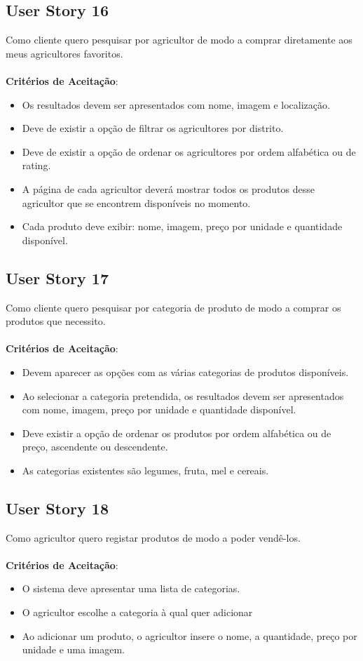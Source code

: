 \documentclass[a4paper,11pt]{article}
\begin{document}
\subsection{User Story 16}
Como cliente quero pesquisar por agricultor de modo a comprar diretamente aos meus agricultores favoritos.\\\\
\textbf{Critérios de Aceitação}:
\begin{itemize}
  \item Os resultados devem ser apresentados com nome, imagem e localização.
  \item Deve de existir a opção de filtrar os agricultores por distrito.
  \item Deve de existir a opção de ordenar os agricultores por ordem alfabética ou de rating.
  \item A página de cada agricultor deverá mostrar todos os produtos desse agricultor que se encontrem disponíveis no momento.
  \item Cada produto deve exibir: nome, imagem, preço por unidade e quantidade disponível.
\end{itemize}
\subsection{User Story 17}
Como cliente quero pesquisar por categoria de produto de modo a comprar os produtos que necessito.\\\\
\textbf{Critérios de Aceitação}:
\begin{itemize}
  \item Devem aparecer as opções com as várias categorias de produtos disponíveis.
  \item Ao selecionar a categoria pretendida, os resultados devem ser apresentados com nome, imagem, preço por unidade e quantidade disponível.
  \item Deve existir a opção de ordenar os produtos por ordem alfabética ou de preço, ascendente ou descendente.
  \item As categorias existentes são legumes, fruta, mel e cereais.
\end{itemize}
\subsection{User Story 18}
Como agricultor quero registar produtos de modo a poder vendê-los.\\\\
\textbf{Critérios de Aceitação}:
\begin{itemize}
  \item O sistema deve apresentar uma lista de categorias.
  \item O agricultor escolhe a categoria à qual quer adicionar 
  \item Ao adicionar um produto, o agricultor insere o nome, a quantidade, preço por unidade e uma imagem.
\end{itemize}
\end{document}
